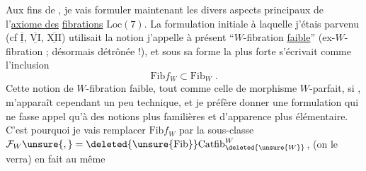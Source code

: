 Aux fins de  , je vais
formuler maintenant les divers aspects principaux
de l'\uline{axiome des} \uline{fibrations} $\mathrm{Loc}(7)$. La formulation
initiale à laquelle j'étais parvenu
(cf $\overline{\underline{\mathrm I}}$, $\overline{\underline{\mathrm{VI}}}$, $\overline{\underline{\mathrm{XII}}}$)  utilisait la notion
 j'appelle à présent ``$W$-fibration \uline{faible}'' \deleted{\unsure{,}}
(ex-$W$-fibration ; désormais détrônée !), et
sous sa forme la plus forte s'écrivait comme
l'inclusion
\[
\mathrm{Fib}f_W\subset\mathrm{Fib}_W\;.
\]
Cette notion de $W$-fibration faible, tout comme
celle de morphisme $W$-parfait, si 
, m'apparaît cependant un
peu technique, et je préfère donner
une formulation qui ne fasse appel
qu'à des notions plus familières et
d'apparence plus élémentaire. C'est pourquoi
je  vais remplacer $\mathrm{Fib}f_W$ par
la sous-classe $\mathcal F_W\unsure{,}=\deleted{\unsure{\mathrm{Fib}}}\mathrm{Catfib}^{W}_{\deleted{\unsure{W}}}$,  
(on le verra)   en fait au même
